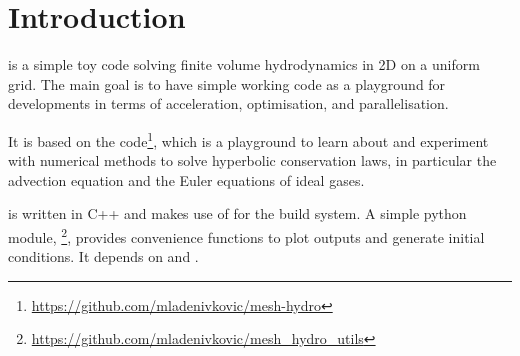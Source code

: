 \newpage


\section{Introduction}


\hydro is a simple toy code solving finite volume hydrodynamics in 2D on a
uniform grid. The main goal is to have simple working code as a playground for
developments in terms of acceleration, optimisation, and parallelisation.

It is based on the 
code\footnote{\url{https://github.com/mladenivkovic/mesh-hydro}}, which is a
playground to learn about and experiment with numerical methods to solve
hyperbolic conservation laws, in particular the advection equation and the Euler
equations of ideal gases.

\hydro is written in C++ and makes use of  for the build system.
A simple python module, \mhutils\footnote{
\url{https://github.com/mladenivkovic/mesh\_hydro\_utils}}, provides convenience
functions to plot outputs and generate initial conditions. It depends on
 and .





